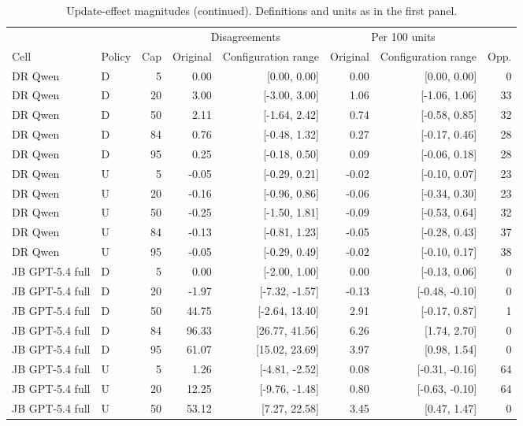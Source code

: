 \clearpage
\begin{table}[!ht]
\ContinuedFloat
\caption{Update-effect magnitudes (continued). Definitions and units as in the first panel.}
\centering\small
\setlength{\tabcolsep}{2pt}
\begin{tabular}{llrrrrrr}
\toprule
& & & \multicolumn{2}{c}{Disagreements} & \multicolumn{2}{c}{Per 100 units} &\\
\cmidrule(lr){4-5}\cmidrule(lr){6-7}
Cell & Policy & Cap & Original & Configuration range & Original & Configuration range & Opp.\\
\midrule
DR Qwen & D & 5 & 0.00 & [0.00, 0.00] & 0.00 & [0.00, 0.00] & 0 \\
DR Qwen & D & 20 & 3.00 & [-3.00, 3.00] & 1.06 & [-1.06, 1.06] & 33 \\
DR Qwen & D & 50 & 2.11 & [-1.64, 2.42] & 0.74 & [-0.58, 0.85] & 32 \\
DR Qwen & D & 84 & 0.76 & [-0.48, 1.32] & 0.27 & [-0.17, 0.46] & 28 \\
DR Qwen & D & 95 & 0.25 & [-0.18, 0.50] & 0.09 & [-0.06, 0.18] & 28 \\
DR Qwen & U & 5 & -0.05 & [-0.29, 0.21] & -0.02 & [-0.10, 0.07] & 23 \\
DR Qwen & U & 20 & -0.16 & [-0.96, 0.86] & -0.06 & [-0.34, 0.30] & 23 \\
DR Qwen & U & 50 & -0.25 & [-1.50, 1.81] & -0.09 & [-0.53, 0.64] & 32 \\
DR Qwen & U & 84 & -0.13 & [-0.81, 1.23] & -0.05 & [-0.28, 0.43] & 37 \\
DR Qwen & U & 95 & -0.05 & [-0.29, 0.49] & -0.02 & [-0.10, 0.17] & 38 \\
JB GPT-5.4 full & D & 5 & 0.00 & [-2.00, 1.00] & 0.00 & [-0.13, 0.06] & 0 \\
JB GPT-5.4 full & D & 20 & -1.97 & [-7.32, -1.57] & -0.13 & [-0.48, -0.10] & 0 \\
JB GPT-5.4 full & D & 50 & 44.75 & [-2.64, 13.40] & 2.91 & [-0.17, 0.87] & 1 \\
JB GPT-5.4 full & D & 84 & 96.33 & [26.77, 41.56] & 6.26 & [1.74, 2.70] & 0 \\
JB GPT-5.4 full & D & 95 & 61.07 & [15.02, 23.69] & 3.97 & [0.98, 1.54] & 0 \\
JB GPT-5.4 full & U & 5 & 1.26 & [-4.81, -2.52] & 0.08 & [-0.31, -0.16] & 64 \\
JB GPT-5.4 full & U & 20 & 12.25 & [-9.76, -1.48] & 0.80 & [-0.63, -0.10] & 64 \\
JB GPT-5.4 full & U & 50 & 53.12 & [7.27, 22.58] & 3.45 & [0.47, 1.47] & 0 \\

\end{tabular}
\end{table}
